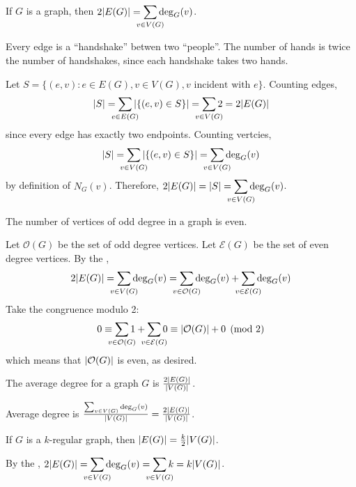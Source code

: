\documentclass[class=math239,notes,tikz]{agony}
\begin{document}
\begin{theorem}\label{thm:hand}
  If $G$ is a graph, then $2\abs{E(G)} = \smashoperator{\sum\limits_{v \in V(G)}} \deg_G(v)$.
\end{theorem}
\begin{prf}[Informal]
  Every edge is a ``handshake'' betwen two ``people''.
  The number of hands is twice the number of handshakes,
  since each handshake takes two hands.
\end{prf}
\begin{prf}[Formal]
  Let $S = \{(e,v) : e \in E(G), v \in V(G), \text{$v$ incident with $e$}\}$.
  Counting edges,
  \[
    \abs{S} = \smashoperator{\sum_{e \in E(G)}} \abs{\{(e,v) \in S\}}
    = \smashoperator{\sum_{v \in V(G)}} 2
    = 2 \abs{E(G)}
  \]
  since every edge has exactly two endpoints.
  Counting vertcies,
  \[
    \abs{S} = \smashoperator{\sum_{v \in V(G)}} \abs{\{(e,v) \in S\}}
    = \smashoperator{\sum_{v \in V(G)}} \deg_G(v)
  \]
  by definition of $N_G(v)$.
  Therefore, $2\abs{E(G)} = \abs{S} = \smashoperator{\sum\limits_{v \in V(G)}} \deg_G(v)$.
\end{prf}

\begin{corollary}[4.3.2]
  The number of vertices of odd degree in a graph is even.
\end{corollary}
\begin{prf}
  Let $\mathcal O(G)$ be the set of odd degree vertices.
  Let $\mathcal E(G)$ be the set of even degree vertices.
  By the ,
  \[
    2\abs{E(G)} = \smashoperator{\sum_{v \in V(G)}} \deg_G(v)
    = \smashoperator{\sum_{v \in \mathcal O(G)}} \deg_G(v) + \smashoperator{\sum_{v \in \mathcal E(G)}} \deg_G(v)
  \]
  Take the congruence modulo 2:
  \[
    0 \equiv \smashoperator{\sum_{v \in \mathcal O(G)}} 1 + \smashoperator{\sum_{v \in \mathcal E(G)}} 0
    \equiv \abs{\mathcal O(G)} + 0 \pmod{2}
  \]
  which means that $\abs{\mathcal O(G)}$ is even, as desired.
\end{prf}

\begin{corollary}[4.3.3]
  The average degree for a graph $G$ is $\frac{2\abs{E(G)}}{\abs{V(G)}}$.
\end{corollary}
\begin{prf}
  Average degree is $\frac{\sum_{v\in V(G)} \deg_G(v)}{\abs{V(G)}} = \frac{2\abs{E(G)}}{\abs{V(G)}}$.
\end{prf}

\begin{corollary}
  If $G$ is a $k$-regular graph, then $\abs{E(G)} = \frac{k}{2}\abs{V(G)}$.
\end{corollary}
\begin{prf}
  By the , $2\abs{E(G)} = \smashoperator{\sum\limits_{v \in V(G)}} \deg_G(v)
    = \smashoperator{\sum\limits_{v \in V(G)}} k = k\abs{V(G)}$.
\end{prf}
\end{document}
